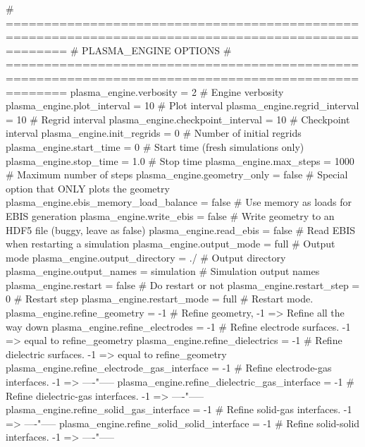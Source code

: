 \begin{DoxyVerb}
  # ====================================================================================================
  # PLASMA_ENGINE OPTIONS
  # ====================================================================================================
  plasma_engine.verbosity                       = 2             # Engine verbosity
  plasma_engine.plot_interval                   = 10            # Plot interval
  plasma_engine.regrid_interval                 = 10            # Regrid interval
  plasma_engine.checkpoint_interval             = 10            # Checkpoint interval
  plasma_engine.init_regrids                    = 0             # Number of initial regrids
  plasma_engine.start_time                      = 0             # Start time (fresh simulations only)
  plasma_engine.stop_time                       = 1.0           # Stop time
  plasma_engine.max_steps                       = 1000          # Maximum number of steps
  plasma_engine.geometry_only                   = false         # Special option that ONLY plots the geometry
  plasma_engine.ebis_memory_load_balance        = false         # Use memory as loads for EBIS generation
  plasma_engine.write_ebis                      = false         # Write geometry to an HDF5 file (buggy, leave as false)
  plasma_engine.read_ebis                       = false         # Read EBIS when restarting a simulation
  plasma_engine.output_mode                     = full          # Output mode
  plasma_engine.output_directory                = ./            # Output directory
  plasma_engine.output_names                    = simulation    # Simulation output names
  plasma_engine.restart                         = false         # Do restart or not
  plasma_engine.restart_step                    = 0             # Restart step
  plasma_engine.restart_mode                    = full          # Restart mode. 
  plasma_engine.refine_geometry                 = -1            # Refine geometry, -1 => Refine all the way down
  plasma_engine.refine_electrodes               = -1            # Refine electrode surfaces. -1 => equal to refine_geometry
  plasma_engine.refine_dielectrics              = -1            # Refine dielectric surfaces. -1 => equal to refine_geometry
  plasma_engine.refine_electrode_gas_interface  = -1            # Refine electrode-gas interfaces. -1 => ----"-----
  plasma_engine.refine_dielectric_gas_interface = -1            # Refine dielectric-gas interfaces. -1 => ----"-----
  plasma_engine.refine_solid_gas_interface      = -1            # Refine solid-gas interfaces. -1 => ----"-----
  plasma_engine.refine_solid_solid_interface    = -1            # Refine solid-solid interfaces. -1 => ----"-----


\end{DoxyVerb}
